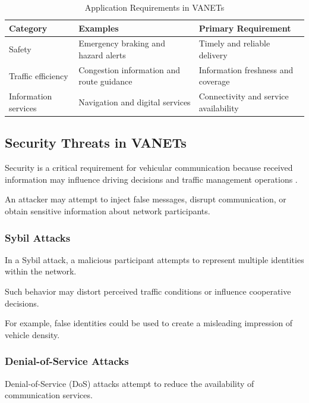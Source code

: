 \begin{table}[htbp]
\centering
\caption{Application Requirements in VANETs}
\label{tab:vanet_applications}
\footnotesize
\begin{tabular}{|p{1.7cm}|p{2.3cm}|p{2.3cm}|}
\hline
\textbf{Category} &
\textbf{Examples} &
\textbf{Primary Requirement} \\
\hline
Safety &
Emergency braking and hazard alerts &
Timely and reliable delivery \\
\hline
Traffic efficiency &
Congestion information and route guidance &
Information freshness and coverage \\
\hline
Information services &
Navigation and digital services &
Connectivity and service availability \\
\hline
\end{tabular}
\end{table}

\subsection{Security Threats in VANETs}
\label{sec:3D}

Security is a critical
requirement for vehicular
communication because
received information
may influence driving
decisions and traffic
management operations
\cite{Zeadally2012}.

An attacker may attempt
to inject false messages,
disrupt communication,
or obtain sensitive
information about
network participants.

\subsubsection{Sybil Attacks}

In a Sybil attack,
a malicious participant
attempts to represent
multiple identities
within the network.

Such behavior may
distort perceived
traffic conditions
or influence
cooperative decisions.

For example, false
identities could
be used to create
a misleading impression
of vehicle density.

\subsubsection{Denial-of-Service Attacks}

Denial-of-Service
(DoS) attacks attempt
to reduce the
availability of
communication services.

